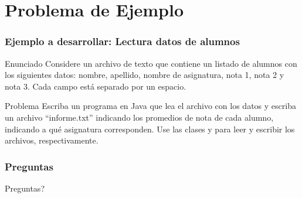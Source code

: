 \documentclass{beamer}
\begin{document}
\section{Problema de Ejemplo}

\begin{frame}
  \frametitle{Ejemplo a desarrollar: Lectura datos de alumnos}

  \begin{block}{Enunciado}
    Considere un archivo de texto que contiene un listado de alumnos
    con los siguientes datos: nombre, apellido, nombre de asignatura,
    nota 1, nota 2 y nota 3. Cada campo está separado por un espacio.
  \end{block}

  \begin{block}{Problema}
    Escriba un programa en Java que lea el archivo con los datos y
    escriba un archivo ``informe.txt'' indicando los promedios de nota
    de cada alumno, indicando a qué asignatura corresponden. Use las
    clases  y  para leer y escribir
    los archivos, respectivamente.
  \end{block}

\end{frame}

\begin{frame}
  \frametitle{Preguntas}
  \hspace{4cm}\huge{Preguntas?}  
\end{frame}
\end{document}
